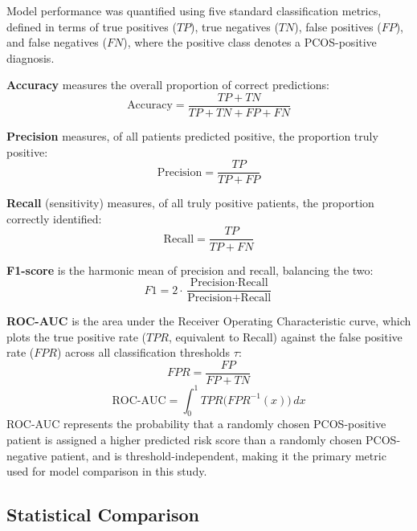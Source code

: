 \documentclass[conference]{IEEEtran}
\begin{document}
Model performance was quantified using five standard classification metrics, defined in terms of true positives ($TP$), true negatives ($TN$), false positives ($FP$), and false negatives ($FN$), where the positive class denotes a PCOS-positive diagnosis.

\textbf{Accuracy} measures the overall proportion of correct predictions:
\begin{equation}
\text{Accuracy} = \frac{TP + TN}{TP + TN + FP + FN}
\label{eq:accuracy}
\end{equation}

\textbf{Precision} measures, of all patients predicted positive, the proportion truly positive:
\begin{equation}
\text{Precision} = \frac{TP}{TP + FP}
\label{eq:precision}
\end{equation}

\textbf{Recall} (sensitivity) measures, of all truly positive patients, the proportion correctly identified:
\begin{equation}
\text{Recall} = \frac{TP}{TP + FN}
\label{eq:recall}
\end{equation}

\textbf{F1-score} is the harmonic mean of precision and recall, balancing the two:
\begin{equation}
F1 = 2 \cdot \frac{\text{Precision} \cdot \text{Recall}}{\text{Precision} + \text{Recall}}
\label{eq:f1}
\end{equation}

\textbf{ROC-AUC} is the area under the Receiver Operating Characteristic curve, which plots the true positive rate ($TPR$, equivalent to Recall) against the false positive rate ($FPR$) across all classification thresholds $\tau$:
\begin{equation}
FPR = \frac{FP}{FP + TN}
\label{eq:fpr}
\end{equation}
\begin{equation}
\text{ROC-AUC} = \int_{0}^{1} TPR\big(FPR^{-1}(x)\big)\, dx
\label{eq:aucroc}
\end{equation}
ROC-AUC represents the probability that a randomly chosen PCOS-positive patient is assigned a higher predicted risk score than a randomly chosen PCOS-negative patient, and is threshold-independent, making it the primary metric used for model comparison in this study.

\subsection{Statistical Comparison}
\end{document}
